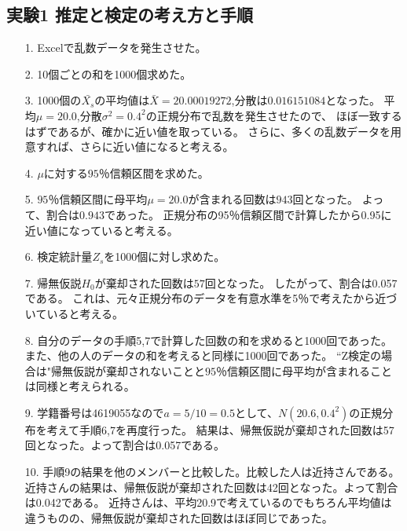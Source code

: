 \documentclass[12pt]{jarticle}
\begin{document}
\subsection{実験1 推定と検定の考え方と手順}
\begin{itemize}
    \item [1.]Excelで乱数データを発生させた。
    \item [2.]10個ごとの和を1000個求めた。
    \item [3.]1000個の$\bar{X_s}$の平均値は$\bar{X}=20.00019272$,分散は$0.016151084$となった。
          平均$\mu=20.0$,分散$\sigma^2=0.4^2$の正規分布で乱数を発生させたので、
          ほぼ一致するはずであるが、確かに近い値を取っている。
          さらに、多くの乱数データを用意すれば、さらに近い値になると考える。

    \item [4.]$\mu$に対する$95％$信頼区間を求めた。

    \item [5.]$95％$信頼区間に母平均$\mu=20.0$が含まれる回数は$943$回となった。
          よって、割合は$0.943$であった。
          正規分布の95％信頼区間で計算したから0.95に近い値になっていると考える。
    \item [6.]検定統計量$Z_s$を1000個に対し求めた。
    \item [7.]帰無仮説$H_0$が棄却された回数は$57$回となった。
          したがって、割合は0.057である。
          これは、元々正規分布のデータを有意水準を5％で考えたから近づいていると考える。
    \item [8.]自分のデータの手順5,7で計算した回数の和を求めると1000回であった。
          また、他の人のデータの和を考えると同様に1000回であった。
          ``Z検定の場合は"帰無仮説が棄却されないことと$95％$信頼区間に母平均が含まれることは同様と考えられる。

    \item [9.]学籍番号は4619055なので$a=5/10=0.5$として、$N(20.6,0.4^2)$の正規分布を考えて手順6,7を再度行った。
          結果は、帰無仮説が棄却された回数は57回となった。よって割合は0.057である。
    \item [10.]手順9の結果を他のメンバーと比較した。比較した人は近持さんである。
          近持さんの結果は、帰無仮説が棄却された回数は42回となった。よって割合は0.042である。
          近持さんは、平均20.9で考えているのでもちろん平均値は違うものの、帰無仮説が棄却された回数はほぼ同じであった。
\end{itemize}
\end{document}
